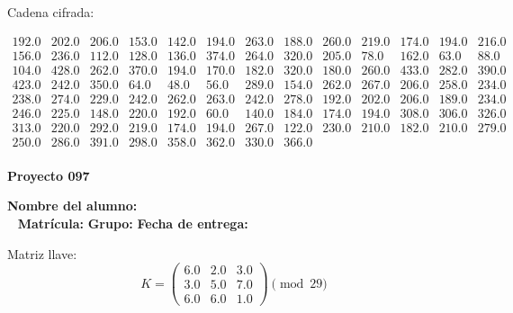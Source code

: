 \documentclass[12pt]{article}
\begin{document}
Cadena cifrada:
\begin{center}
$\begin{array}{lllllllllllll}
192.0 & 202.0 & 206.0 & 153.0 & 142.0 & 194.0 & 263.0 & 188.0 & 260.0 & 219.0 & 174.0 & 194.0 & 216.0\\
156.0 & 236.0 & 112.0 & 128.0 & 136.0 & 374.0 & 264.0 & 320.0 & 205.0 & 78.0 & 162.0 & 63.0 & 88.0\\
104.0 & 428.0 & 262.0 & 370.0 & 194.0 & 170.0 & 182.0 & 320.0 & 180.0 & 260.0 & 433.0 & 282.0 & 390.0\\
423.0 & 242.0 & 350.0 & 64.0 & 48.0 & 56.0 & 289.0 & 154.0 & 262.0 & 267.0 & 206.0 & 258.0 & 234.0\\
238.0 & 274.0 & 229.0 & 242.0 & 262.0 & 263.0 & 242.0 & 278.0 & 192.0 & 202.0 & 206.0 & 189.0 & 234.0\\
246.0 & 225.0 & 148.0 & 220.0 & 192.0 & 60.0 & 140.0 & 184.0 & 174.0 & 194.0 & 308.0 & 306.0 & 326.0\\
313.0 & 220.0 & 292.0 & 219.0 & 174.0 & 194.0 & 267.0 & 122.0 & 230.0 & 210.0 & 182.0 & 210.0 & 279.0\\
250.0 & 286.0 & 391.0 & 298.0 & 358.0 & 362.0 & 330.0 & 366.0\\
\end{array}$
\end{center}

\newpage


\textbf{Proyecto 097}

\textbf{Nombre del alumno:} \underline{\hspace{13cm}}\\\
\vspace{1cm}
\textbf{Matrícula:} \underline{\hspace{4cm}} \hspace{1cm}
\textbf{Grupo:} \underline{\hspace{2cm}}
\textbf{Fecha de entrega:} \underline{\hspace{2cm}}

\medskip

Matriz llave:
\[
K = \begin{pmatrix}
6.0 & 2.0 & 3.0\\
3.0 & 5.0 & 7.0\\
6.0 & 6.0 & 1.0
\end{pmatrix} \pmod{29}
\]
\end{document}
